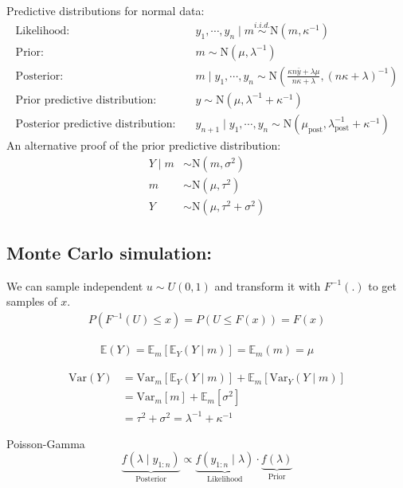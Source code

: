\documentclass{article}\usepackage[]{graphicx}\usepackage[]{xcolor}
\begin{document}
\begin{multicols*}{2}
Predictive distributions for normal data:
\begin{align*}
    \text{Likelihood:} \quad & y_1,\cdots,y_n\mid m \overset{i.i.d.}{\sim} \text{N}(m,\kappa^{-1}) \\
    \text{Prior:} \quad & m \sim \text{N}(\mu,\lambda^{-1}) \\
    \text{Posterior:} \quad & m\mid y_1,\cdots,y_n \sim 
    \text{N}\left(\frac{\kappa n\bar{y}+\lambda\mu}{n\kappa+\lambda}, (n\kappa+\lambda)^{-1} \right) \\
    \text{Prior predictive distribution:} \quad & y\sim \text{N}(\mu,\lambda^{-1}+\kappa^{-1}) \\
    \text{Posterior predictive distribution:} \quad & 
    y_{n+1}\mid y_1,\cdots,y_n \sim \text{N}(\mu_\text{post},\lambda_\text{post}^{-1}+\kappa^{-1})
\end{align*}
An alternative proof of the prior predictive distribution:
\begin{align*}
    Y\mid m &\sim \text{N}(m, \sigma^2) \\
    m &\sim \text{N}(\mu,\tau^2) \\
    Y &\sim \text{N}(\mu,\tau^2+\sigma^2)
\end{align*}


\subsection{Monte Carlo simulation:}
We can sample independent $u\sim U(0,1)$ and transform it with $F^{-1}(.)$ to get samples of $x$.
\begin{align*}
\boxed{P(F^{-1}(U)\leq x)=P(U\leq F(x))=F(x)}
\end{align*}


\begin{align*}
\mathbb{E}(Y)=\mathbb{E}_m[\mathbb{E}_Y(Y\mid m)]=\mathbb{E}_m(m)=\mu
\end{align*}

\begin{align*}
\text{Var}(Y)&=\text{Var}_m[\mathbb{E}_Y(Y\mid m)]+\mathbb{E}_m[\text{Var}_Y(Y\mid m)] \\
&=\text{Var}_m[m]+\mathbb{E}_m[\sigma^2] \\
&=\tau^2+\sigma^2=\lambda^{-1}+\kappa^{-1}
\end{align*}

Poisson-Gamma
\begin{equation*}
\underbrace{f(\lambda\mid y_{1:n})}_\text{Posterior} \propto 
\underbrace{f(y_{1:n}\mid\lambda)}_\text{Likelihood} \cdot 
\underbrace{f(\lambda)}_\text{Prior}
\end{equation*}


\end{multicols*}
\end{document}
